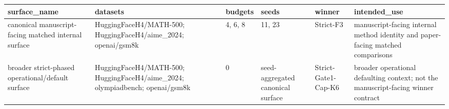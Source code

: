\begin{tabular}{llllll}
\hline
surface\_name & datasets & budgets & seeds & winner & intended\_use \\
\hline
canonical manuscript-facing matched internal surface & HuggingFaceH4/MATH-500; HuggingFaceH4/aime\_2024; openai/gsm8k & 4, 6, 8 & 11, 23 & Strict-F3 & manuscript-facing internal method identity and paper-facing matched comparisons \\
broader strict-phased operational/default surface & HuggingFaceH4/MATH-500; HuggingFaceH4/aime\_2024; olympiadbench; openai/gsm8k & 0 & seed-aggregated canonical surface & Strict-Gate1-Cap-K6 & broader operational defaulting context; not the manuscript-facing winner contract \\
\hline
\end{tabular}

